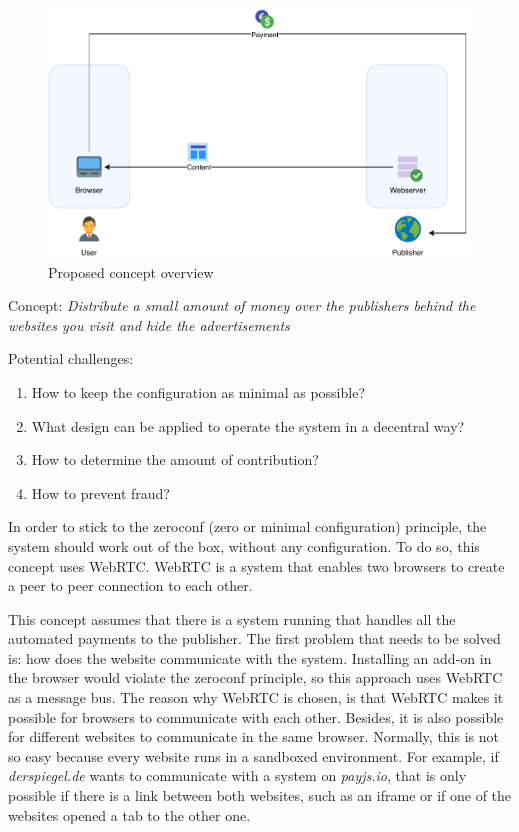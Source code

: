 \begin{figure}[h!]
  \center
  \includegraphics[width=12cm]{images/concept.pdf}
  \caption{Proposed concept overview}
\end{figure}
\vspace{2em}

Concept: \textit{Distribute a small amount of money over the publishers behind the websites you visit and hide the advertisements}

\vspace{2em}

Potential challenges:
\begin{enumerate}
  \item How to keep the configuration as minimal as possible?
  \item What design can be applied to operate the system in a decentral way?
  \item How to determine the amount of contribution?
  \item How to prevent fraud?
\end{enumerate}


In order to stick to the zeroconf (zero or minimal configuration) principle, the system should work out of the box, without any configuration. To do so, this concept uses WebRTC. WebRTC is a system that enables two browsers to create a peer to peer connection to each other.

This concept assumes that there is a system running that handles all the automated payments to the publisher. The first problem that needs to be solved is: how does the website communicate with the system. Installing an add-on in the browser would violate the zeroconf principle, so this approach uses WebRTC as a message bus. The reason why WebRTC is chosen, is that WebRTC makes it possible for browsers to communicate with each other. Besides, it is also possible for different websites to communicate in the same browser. Normally, this is not so easy because every website runs in a sandboxed environment. For example, if \textit{derspiegel.de} wants to communicate with a system on \textit{payjs.io}, that is only possible if there is a link between both websites, such as an iframe or if one of the websites opened a tab to the other one. 

